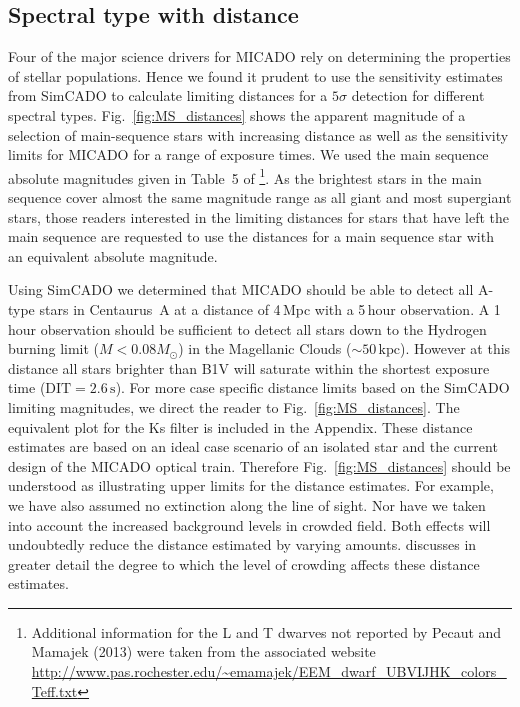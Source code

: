 \subsection{Spectral type with distance}
\label{subsec:spec_type_vs_dist}

Four of the major science drivers for MICADO rely on determining the properties of stellar populations.
Hence we found it prudent to use the sensitivity estimates from SimCADO to calculate limiting distances for a $5\sigma$ detection for different spectral types.
Fig.~\ref{fig:MS_distances} shows the apparent magnitude of a selection of main-sequence stars with increasing distance as well as the sensitivity limits for MICADO for a range of exposure times.
We used the main sequence absolute magnitudes given in Table~5 of \citet{pecaut2013}\footnote{Additional information for the L and T dwarves not reported by Pecaut and Mamajek (2013) were taken from the associated website \url{http://www.pas.rochester.edu/~emamajek/EEM_dwarf_UBVIJHK_colors_Teff.txt}}.
As the brightest stars in the main sequence cover almost the same magnitude range as all giant and most supergiant stars, those readers interested in the limiting distances for stars that have left the main sequence are requested to use the distances for a main sequence star with an equivalent absolute magnitude. 

Using SimCADO we determined that MICADO should be able to detect all A-type stars in Centaurus~A at a distance of 4\,Mpc with a 5\,hour observation.
A 1\,hour observation should be sufficient to detect all stars down to the Hydrogen burning limit ($M < 0.08 M_{\odot}$) in the Magellanic Clouds ($\sim 50\,\mathrm{kpc}$).
However at this distance all stars brighter than B1V will saturate within the shortest exposure time ($\mathrm{DIT} =2.6\,\mathrm{s}$).
For more case specific distance limits based on the SimCADO limiting magnitudes, we direct the reader to Fig.~\ref{fig:MS_distances}.
The equivalent plot for the Ks filter is included in the Appendix.
These distance estimates are based on an ideal case scenario of an isolated star and the current design of the MICADO optical train.
Therefore Fig.~\ref{fig:MS_distances} should be understood as illustrating upper limits for the distance estimates.
For example, we have also assumed no extinction along the line of sight.
Nor have we taken into account the increased background levels in crowded field.
Both effects will undoubtedly reduce the distance estimated by varying amounts.
\cite{leschinski2020} discusses in greater detail the degree to which the level of crowding affects these distance estimates.


